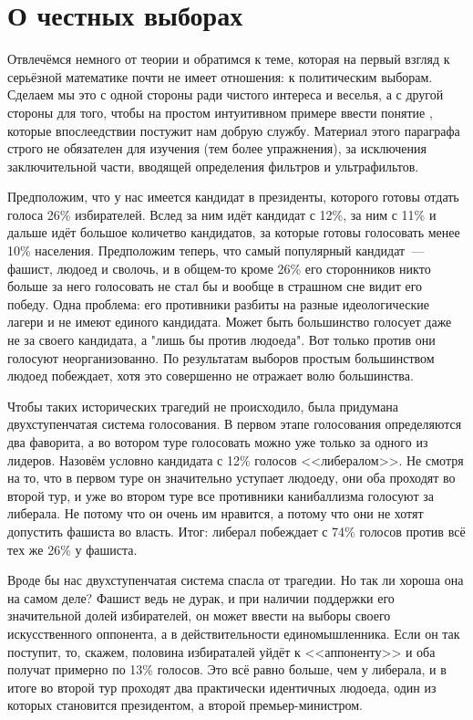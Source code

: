 \section{О честных выборах}

Отвлечёмся немного от теории и обратимся к теме, которая на первый взгляд к серьёзной математике почти не имеет отношения: к политическим выборам. Сделаем мы это с одной стороны ради чистого интереса и веселья, а с другой стороны для того, чтобы на простом интуитивном примере ввести понятие , которые впослеедствии постужит нам добрую службу. Материал этого параграфа строго не обязателен для изучения (тем более упражнения), за исключения заключительной части, вводящей определения фильтров и ультрафильтов.

Предположим, что у нас имеется кандидат в президенты, которого готовы отдать голоса 26\% избирателей. Вслед за ним идёт кандидат с 12\%, за ним с 11\% и дальше идёт большое количетво кандидатов, за которые готовы голосовать менее 10\% населения. Предположим теперь, что самый популярный кандидат~--- фашист, людоед и сволочь, и в общем-то кроме 26\% его сторонников никто больше за него голосовать не стал бы и вообще в страшном сне видит его победу. Одна проблема: его противники разбиты на разные идеологические лагери и не имеют единого кандидата. Может быть большинство голосует даже не за своего кандидата, а "лишь бы против людоеда". Вот только против они голосуют неорганизованно. По результатам выборов простым большинством людоед побеждает, хотя это совершенно не отражает волю большинства.

Чтобы таких исторических трагедий не происходило, была придумана двухступенчатая система голосования. В первом этапе голосования определяются два фаворита, а во вотором туре голосовать можно уже только за одного из лидеров. Назовём условно кандидата с 12\% голосов <<либералом>>. Не смотря на то, что в первом туре он значительно уступает людоеду, они оба проходят во второй тур, и уже во втором туре все противники канибаллизма голосуют за либерала. Не потому что он очень им нравится, а потому что они не хотят допустить фашиста во власть. Итог: либерал побеждает с 74\% голосов против всё тех же 26\% у фашиста.

Вроде бы нас двухступенчатая система спасла от трагедии. Но так ли хороша она на самом деле? Фашист ведь не дурак, и при наличии поддержки его значительной долей избирателей, он может ввести на выборы своего искусственного оппонента, а в действительности единомышленника. Если он так поступит, то, скажем, половина избираталей уйдёт к <<аппоненту>> и оба получат примерно по 13\% голосов. Это всё равно больше, чем у либерала, и в итоге во второй тур проходят два практически идентичных людоеда, один из которых становится президентом, а второй премьер-министром.


